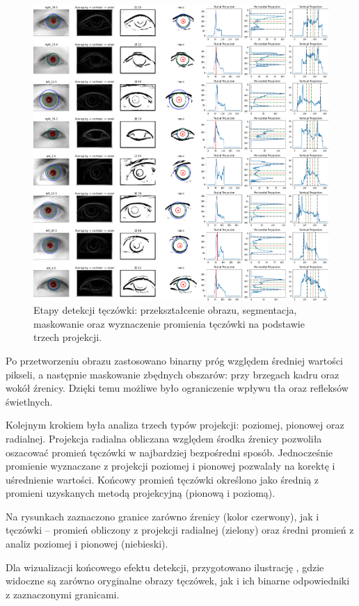 \documentclass[a4paper]{article}
\begin{document}
\begin{figure}[H]
    \centering
    \includegraphics[width=0.95\linewidth]{figures/irises_detection_many.png}
    \caption{Etapy detekcji tęczówki: przekształcenie obrazu, segmentacja, maskowanie oraz wyznaczenie promienia tęczówki na podstawie trzech projekcji.}
    \label{fig:irises_detection_many}
\end{figure}

Po przetworzeniu obrazu zastosowano binarny próg względem średniej wartości pikseli, a następnie maskowanie zbędnych obszarów: przy brzegach kadru oraz wokół źrenicy. Dzięki temu możliwe było ograniczenie wpływu tła oraz refleksów świetlnych.

Kolejnym krokiem była analiza trzech typów projekcji: poziomej, pionowej oraz radialnej. Projekcja radialna obliczana względem środka źrenicy pozwoliła oszacować promień tęczówki w najbardziej bezpośredni sposób. Jednocześnie promienie wyznaczane z projekcji poziomej i pionowej pozwalały na korektę i uśrednienie wartości. Końcowy promień tęczówki określono jako średnią z promieni uzyskanych metodą projekcyjną (pionową i poziomą).

Na rysunkach zaznaczono granice zarówno źrenicy (kolor czerwony), jak i tęczówki – promień obliczony z projekcji radialnej (zielony) oraz średni promień z analiz poziomej i pionowej (niebieski).

Dla wizualizacji końcowego efektu detekcji, przygotowano ilustrację , gdzie widoczne są zarówno oryginalne obrazy tęczówek, jak i ich binarne odpowiedniki z zaznaczonymi granicami.
\end{document}
